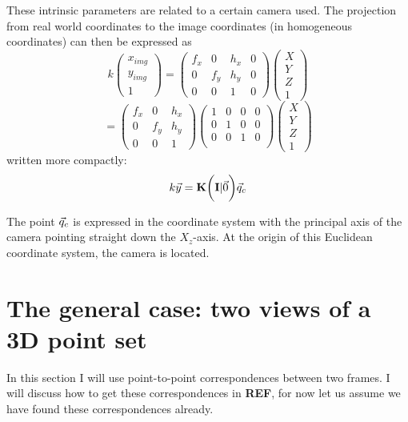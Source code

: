 These intrinsic parameters are related to a certain camera used. The projection from real world coordinates to the image coordinates (in homogeneous coordinates) can then be expressed as
\begin{equation}
    k\begin{pmatrix}
        x_{img}\\y_{img}\\1
    \end{pmatrix} = \begin{pmatrix}
        f_x & 0 & h_x & 0\\
        0 & f_y & h_y & 0\\
        0 & 0 & 1 & 0
    \end{pmatrix}\begin{pmatrix}
        X \\ Y \\ Z \\ 1
    \end{pmatrix}
\end{equation}
\begin{equation*}
    = \begin{pmatrix}
        f_x & 0 & h_x \\
        0 & f_y & h_y \\
        0 & 0 & 1
    \end{pmatrix}
    \begin{pmatrix}
        1 & 0 & 0 & 0\\
        0 & 1 & 0 & 0\\
        0 & 0 & 1 & 0\\
    \end{pmatrix}
    \begin{pmatrix}
        X \\ Y \\ Z \\ 1
    \end{pmatrix}
\end{equation*}
written more compactly:
\begin{equation}
    k\vec y = \mathbf{K} \biggl(\mathbf{I} \lvert \vec 0\biggr)\vec q_c
\end{equation}

The point $\vec q_c$ is expressed in the coordinate system with the principal axis of the camera pointing straight down the $X_z$-axis. At the origin of this Euclidean coordinate system, the camera is located.

\section{The general case: two views of a 3D point set}\label{sec:gen_case}
In this section I will use point-to-point correspondences between two frames. I will discuss how to get these correspondences in \textbf{REF}, for now let us assume we have found these correspondences already.\bigskip

